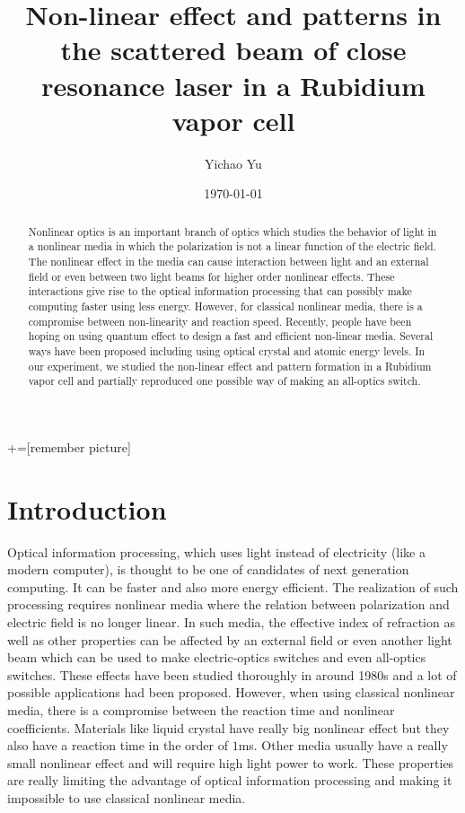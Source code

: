 \documentclass[aps,twocolumn,secnumarabic,balancelastpage,amsmath,amssymb,nofootinbib]{revtex4}
\begin{document}
+=[remember picture]
\title{Non-linear effect and patterns in the scattered beam of close resonance laser in a Rubidium vapor cell}
\author{Yichao Yu}
\date{\today}

\begin{abstract}
  Nonlinear optics is an important branch of optics which studies the behavior of light in a nonlinear media in which the polarization is not a linear function of the electric field. The nonlinear effect in the media can cause interaction between light and an external field or even between two light beams for higher order nonlinear effects. These interactions give rise to the optical information processing that can possibly make computing faster using less energy. However, for classical nonlinear media, there is a compromise between non-linearity and reaction speed. Recently, people have been hoping on using quantum effect to design a fast and efficient non-linear media. Several ways have been proposed including using optical crystal and atomic energy levels. In our experiment, we studied the non-linear effect and pattern formation in a Rubidium vapor cell and partially reproduced one possible way of making an all-optics switch.
\end{abstract}

\maketitle
\section*{Introduction}
Optical information processing, which uses light instead of electricity (like a modern computer), is thought to be one of candidates of next generation computing. It can be faster and also more energy efficient. The realization of such processing requires nonlinear media where the relation between polarization and electric field is no longer linear. In such media, the effective index of refraction as well as other properties can be affected by an external field or even another light beam which can be used to make electric-optics switches and even all-optics switches. These effects have been studied thoroughly in around 1980s and a lot of possible applications had been proposed. However, when using classical nonlinear media, there is a compromise between the reaction time and nonlinear coefficients. Materials like liquid crystal have really big nonlinear effect but they also have a reaction time in the order of $1$ms. Other media usually have a really small nonlinear effect and will require high light power to work. These properties are really limiting the advantage of optical information processing and making it impossible to use classical nonlinear media.
\end{document}
